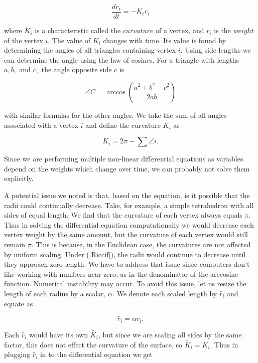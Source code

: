 \documentclass[12pt]{article}
\begin{document}
  \begin{equation}
  \label{Riccif}
  \frac{dr_i}{{dt}} = -K_ir_i
  \end{equation}
  
\noindent where $K_i$ is a characteristic called the $curvature$ of a vertex, and $r_i$ is the $weight$ of the vertex $i$. The value of $K_i$ changes with time. Its value is found by determining the angles of all triangles containing vertex $i$. Using side lengths we can determine the angle using the law of cosines. For a triangle with lengths $a, b,\mbox{ and }c,$ the angle opposite side $c$ is
  
  $$
  \angle C = \arccos(\frac{a^2 + b^2 - c^2}{2ab})
  $$
  
\noindent with similar formulas for the other angles. We take the sum of all angles associated with a vertex $i$ and define the curvature $K_i$ as

\begin{equation}
K_i = 2\pi - \sum{\angle i}.
\end{equation}
  
\noindent Since we are performing multiple non-linear differential equations as variables depend on the weights which change over time, we can probably not solve them explicitly.\newline
   
\noindent A potential issue we noted is that, based on the equation, is it possible that the radii could continually decrease. Take, for example, a simple tetrahedron with all sides of equal length. We find that the curvature of each vertex always equals $\pi$. Thus in solving the differential equation computationally we would decrease each vertex weight by the same amount, but the curvature of each vertex would still remain $\pi.$ This is because, in the Euclidean case, the curvatures are not affected by uniform scaling. Under (\ref{Riccif}), the radii would continue to decrease until they approach zero length. We have to address that issue since computers don't like working with numbers near zero, as in the denominator of the arccosine function. Numerical instability may occur. To avoid this issue, let us resize the length of each radius by a scalar, $\alpha$. We denote each scaled length by $\tilde{r_i}$ and equate as
 
$$ \tilde{r_i} = \alpha r_i. $$ 
 
\noindent Each $\tilde{r_i}$ would have its own $\tilde{K_i}$, but since we are scaling all sides by the same factor, this does not effect the curvature of the surface, so $\tilde{K_i} = K_i$. Thus in plugging $\tilde{r_i}$ in to the differential equation we get
 
\end{document}
